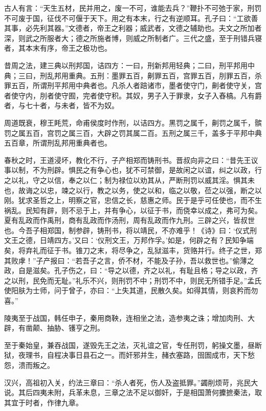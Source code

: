 \documentclass[12pt,UTF8]{ctexbook}
\begin{document}
古人有言：“天生五材，民并用之，废一不可，谁能去兵？”鞭扑不可弛于家，刑罚不可废于国，征伐不可偃于天下。用之有本末，行之有逆顺耳。孔子曰：“工欲善其事，必先利其器。”文德者，帝王之利器；威武者，文德之辅助也。夫文之所加者深，则武之所服者大；德之所施者博，则威之所制者广。三代之盛，至于刑错兵寝者，其本末有序，帝王之极功也。



昔周之法，建三典以刑邦国，诘四方：一曰，刑新邦用轻典；二曰，刑平邦用中典；三曰，刑乱邦用重典。五刑：墨罪五百，劓罪五百，宫罪五百，刖罪五百，杀罪五百，所谓刑平邦用中典者也。凡杀人者踣诸市，墨者使守门，劓者使守关，宫者使守内，刖者使守囿，完者使守积。其奴，男子入于罪隶，女子入舂槁。凡有爵者，与七十者，与未者，皆不为奴。



周道既衰，穆王眊荒，命甫侯度时作刑，以诘四方。黑罚之属千，劓罚之属千，髌罚之属五百，宫罚之属三百，大辟之罚其属二百。五刑之属三千，盖多于平邦中典五百章，所谓刑乱邦用重典者也。



春秋之时，王道浸坏，教化不行，子产相郑而铸刑书。晋叔向非之曰：“昔先王议事以制，不为刑辟。惧民之有争心也，犹不可禁御，是故闲之以谊，纠之以政，行之以礼，守之以信，奉之以仁；制为禄位以劝其从，严断刑罚以威其淫。惧其未也，故诲之以忠，竦之以行，教之以务，使之以和，临之以敬，莅之以强，断之以刚。犹求圣哲之上，明察之官，忠信之长，慈惠之师。民于是乎可任使也，而不生祸乱。民知有辟，则不忌于上，并有争心，以征于书，而侥幸以成之，弗可为矣。夏有乱政而作禹刑，商有乱政而作汤刑，周有乱政而作九刑。三辟之兴，皆叔世也。今吾子相郑国，制参辟，铸刑书，将以靖民，不亦难乎！《诗》曰：‘仪式刑文王之德，日靖四方。’又曰：‘仪刑文王，万邦作孚。’如是，何辟之有？民知争端矣，将弃礼而征于书。锥刀之末，将尽争之，乱狱滋丰，货赂并行。终子之世，郑其败虖！”子产报曰：“若吾子之言，侨不材，不能及子孙，吾以救世也。”偷薄之政，自是滋矣。孔子伤之，曰：“导之以德，齐之以礼，有耻且格；导之以政，齐之以刑，民免而无耻。”礼乐不兴，则刑罚不中；刑罚不中，则民无所错手足。”孟氏使阳肤为士师，问于曾子，亦曰：“上失其道，民散久矣。如得其情，则哀矜而勿喜。”



陵夷至于战国，韩任申子，秦用商鞅，连相坐之法，造参夷之诛；增加肉刑、大辟，有凿颠、抽胁、镬亨之刑。



至于秦始皇，兼吞战国，遂毁先王之法，灭礼谊之官，专任刑罚，躬操文墨，昼断狱，夜理书，自程决事日县石之一。而奸邪并生，赭衣塞路，囹圄成市，天下愁怨，溃而叛之。



汉兴，高祖初入关，约法三章曰：“杀人者死，伤人及盗抵罪。”蠲削烦苛，兆民大说。其后四夷未附，兵革未息，三章之法不足以御奸，于是相国萧何攈摭秦法，取其宜于时者，作律九章。
\end{document}
